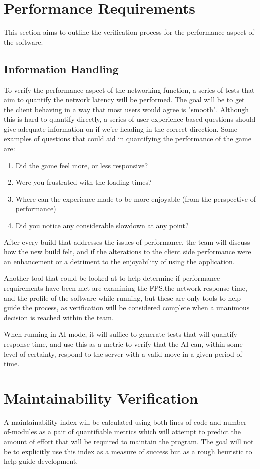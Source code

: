 \documentclass[12pt]{article}
\begin{document}
\section{Performance Requirements}

This section aims to outline the verification process for the performance aspect
of the software.  

\subsection{Information Handling}

To verify the performance aspect of the networking function, a series of tests
that aim to quantify the network latency will be performed.  The goal will be
to get the client behaving in a way that most users would agree is "smooth".
Although this is hard to quantify directly, a series of user-experience based
questions should give adequate information on if we're heading in the correct
direction. Some examples of questions that could aid in quantifying the
performance of the game are:
\begin{enumerate}
\item Did the game feel more, or less responsive?
\item Were you frustrated with the loading times?
\item Where can the experience made to be more enjoyable (from the perspective of performance)
\item Did you notice any considerable slowdown at any point?
\end{enumerate}
After every build that addresses the issues of performance, the team will 
discuss how the new build felt, and if the alterations to the client side
performance were an enhancement or a detriment to the enjoyability of using
the application.

Another tool that could be looked at to help determine if performance 
requirements have been met are examining the FPS,the network
response time, and the profile of the software while running, but
these are only tools to help guide the process, as verification will be
considered complete when a unanimous decision is reached within the team.


When running in AI mode, it will suffice to generate tests that will quantify
response time, and use this as a metric to verify that the AI can, within some
level of certainty, respond to the server with a valid move in a given period
of time.

\section{Maintainability Verification}
A maintainability index will be calculated using both lines-of-code and
number-of-modules as a pair of quantifiable metrics which will attempt to predict
the amount of effort that will be required to maintain the program. The goal 
will not be to explicitly use this index as a measure of success but as a rough
heuristic to help guide development.
\end{document}
